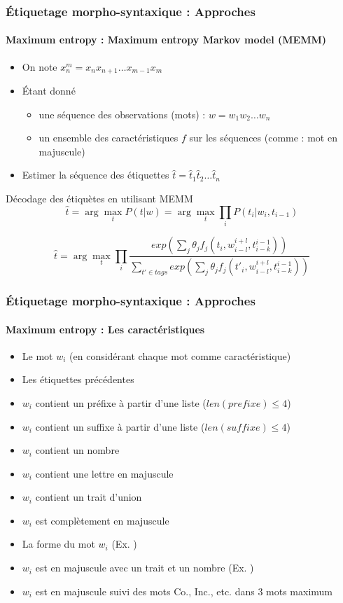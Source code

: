 \documentclass[xcolor=table]{beamer}
\begin{document}
\begin{frame}
\frametitle{Étiquetage morpho-syntaxique : Approches}
\framesubtitle{Maximum entropy : Maximum entropy Markov model (MEMM)}

\begin{itemize}
	\item On note $x_{n}^{m} = x_n x_{n+1} \ldots x_{m-1} x_m$
	\item Étant donné 
	\begin{itemize}
		\item une séquence des observations (mots) : $w = w_1 w_2 \ldots w_n$
		\item un ensemble des caractéristiques $f$ sur les séquences (comme : mot en majuscule)
	\end{itemize}
	\item Estimer la séquence des étiquettes $\hat{t} = \hat{t}_1 \hat{t}_2 \ldots \hat{t}_n$
\end{itemize}

\begin{block}{Décodage des étiquètes en utilisant MEMM}
	\[
	\hat{t} = \arg\max\limits_t P(t | w) = \arg\max\limits_t \prod\limits_{i}  P(t_i | w_i, t_{i-1})
	\]
	
	\[
	\hat{t} = \arg\max\limits_t \prod\limits_{i}  
	\frac{exp\left(\sum_j \theta_j f_j(t_i, w_{i-l}^{i+l}, t_{i-k}^{i-1})\right)}%
	{\sum_{t' \in tags} exp\left(\sum_j \theta_j f_j(t'_i, w_{i-l}^{i+l}, t_{i-k}^{i-1})\right)}
	\]

\end{block}

\end{frame}

\begin{frame}
\frametitle{Étiquetage morpho-syntaxique : Approches}
\framesubtitle{Maximum entropy : Les caractéristiques}

\begin{itemize}
	\item Le mot $w_i$ (en considérant chaque mot comme caractéristique)
	\item Les étiquettes précédentes 
	\item $w_i$ contient un préfixe à partir d'une liste ($len(prefixe) \le 4$) 
	\item $w_i$ contient un suffixe à partir d'une liste ($len(suffixe) \le 4$) 
	\item $w_i$ contient un nombre 
	\item $w_i$ contient une lettre en majuscule
	\item $w_i$ contient un trait d'union 
	\item $w_i$ est complètement en majuscule
	\item La forme du mot $w_i$ (Ex. ) 
	\item $w_i$ est en majuscule avec un trait et un nombre (Ex. ) 
	\item $w_i$ est en majuscule suivi des mots Co., Inc., etc. dans 3 mots maximum
\end{itemize}

\end{frame}
\end{document}
